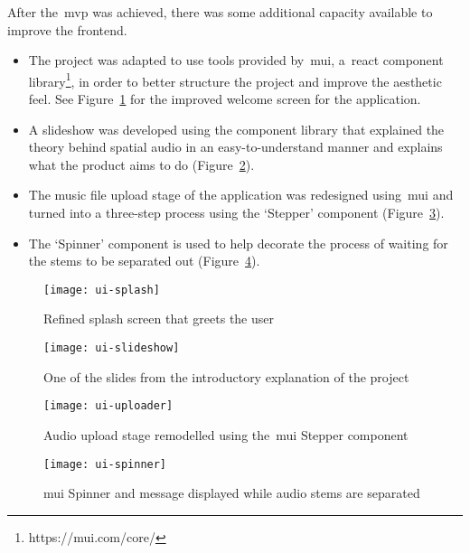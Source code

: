 After the~\gls{mvp} was achieved, there was some additional capacity available to improve the frontend.

\begin{itemize}
    \item The project was adapted to use tools provided by~\gls{mui}, a~\gls{react} component library\footnote{https://mui.com/core/}, in order to better structure the project and improve the aesthetic feel.
    See Figure~\ref{fig:ui-splash} for the improved welcome screen for the application.
    \item A slideshow was developed using the component library that explained the theory behind spatial audio in an easy-to-understand manner and explains what the product aims to do (Figure~\ref{fig:ui-slideshow}).
    \item The music file upload stage of the application was redesigned using~\gls{mui} and turned into a three-step process using the `Stepper' component (Figure~\ref{fig:ui-uploader}).
    \item The `Spinner' component is used to help decorate the process of waiting for the stems to be separated out (Figure~\ref{fig:ui-spinner}).
\end{itemize}

\begin{figure}[!htb]
    \minipage{\textwidth}
    \texttt{[image: ui-splash]}
    \caption{Refined splash screen that greets the user}\label{fig:ui-splash}
    \endminipage\hfill
\end{figure}

\begin{figure}[!htb]
    \minipage{\textwidth}
    \texttt{[image: ui-slideshow]}
    \caption{One of the slides from the introductory explanation of the project}\label{fig:ui-slideshow}
    \endminipage\hfill
\end{figure}

\begin{figure}[!htb]
    \minipage{\textwidth}
    \texttt{[image: ui-uploader]}
    \caption{Audio upload stage remodelled using the~\gls{mui} Stepper component}\label{fig:ui-uploader}
    \endminipage\hfill
\end{figure}

\begin{figure}[!htb]
    \minipage{\textwidth}
    \texttt{[image: ui-spinner]}
    \caption{\gls{mui} Spinner and message displayed while audio stems are separated}\label{fig:ui-spinner}
    \endminipage
\end{figure}

